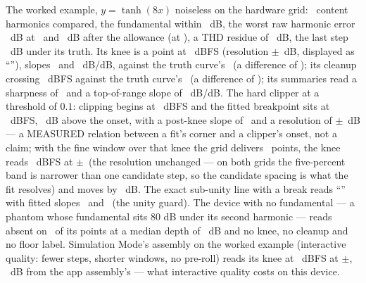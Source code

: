 \documentclass[11pt,a4paper]{article}
\begin{document}
The worked example, $y = \tanh(8x)$ noiseless on the hardware grid:
\cparityWorkedContent\ content harmonics compared, the fundamental within
\cparityWorkedHOne\ dB, the worst raw harmonic error \cparityWorkedRaw\ dB
at \cparityWorkedRawAt\ and \cparityWorkedResidue\ dB after the allowance
(at \cparityWorkedResidueAt), a THD residue of \cparityWorkedTHDResidue\
dB, the last step \cparityWorkedFade\ dB under its truth. Its knee is a
point at \cparityWorkedKnee\ dBFS (resolution $\pm$\cparityWorkedKneeResolution\
dB, displayed as ``\cparityWorkedKneeLabel''), slopes
\cparityWorkedPreSlope\ and \cparityWorkedPostSlope\ dB/dB, against the
truth curve's \cparityWorkedTruthKnee\ (a difference of
\cparityWorkedKneeError); its cleanup crossing \cparityWorkedCleanup\ dBFS
against the truth curve's \cparityWorkedTruthCleanup\ (a difference of
\cparityWorkedCleanupError); its summaries read a sharpness of
\cparityWorkedSharpness\ and a top-of-range slope of
\cparityWorkedAsymptote\ dB/dB. The hard clipper at a threshold of
$0.1$: clipping begins at \cparityClipOnset\ dBFS and the fitted
breakpoint sits at \cparityClipKnee\ dBFS, \cparityClipKneeAboveOnset\ dB
above the onset, with a post-knee slope of \cparityClipPostSlope\ and a
resolution of $\pm$\cparityClipResolution\ dB --- a MEASURED relation
between a fit's corner and a clipper's onset, not a claim; with the fine
window over that knee the grid delivers \cparityFineDelivered\ points,
the knee reads \cparityFineKnee\ dBFS at $\pm$\cparityFineKneeResolution\
(the resolution unchanged --- on both grids the five-percent band is
narrower than one candidate step, so the candidate spacing is what the
fit resolves) and moves by \cparityFineKneeMove\ dB. The exact sub-unity
line with a break reads ``\cparityBreakKnee'' with fitted slopes
\cparityBreakPreSlope\ and \cparityBreakPostSlope\ (the unity guard). The
device with no fundamental --- a phantom whose fundamental sits 80 dB
under its second harmonic --- reads absent on \cparityAbsentFraction\ of
its points at a median depth of \cparityAbsentDepth\ dB and no knee, no
cleanup and no floor label. Simulation Mode's assembly on the worked
example (interactive quality: fewer steps, shorter windows, no pre-roll)
reads its knee at \cparitySimulationKnee\ dBFS at
$\pm$\cparitySimulationKneeResolution, \cparitySimulationKneeGap\ dB from
the app assembly's --- what interactive quality costs on this device.
\end{document}
